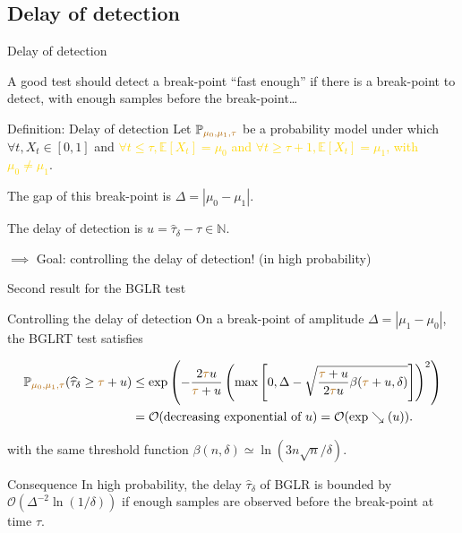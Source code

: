 \documentclass[11pt,french,ignorenonframetext,]{beamer}
\begin{document}
\subsection{\hfill{}Delay of detection\hfill{}}

\begin{frame}{Delay of detection}

  A good test should detect a break-point ``fast enough'' if there is a break-point to detect, with enough samples before the break-point\ldots

  \pause
  \begin{block}{Definition: Delay of detection}
    Let $\mathbb{P}_{\textcolor{gold}{\mu_0,\mu_1,\tau}}$ be a probability model under which $\forall t, X_t \in[0,1]$ and \textcolor{gold}{$\forall t \leq \tau, \mathbb{E}[X_t] = \mu_0$ and $\forall t \geq \tau + 1, \mathbb{E}[X_t] = \mu_1$,
    with $\mu_0 \neq \mu_1$}.

    The \alert{gap} of this break-point is $\Delta = |\mu_0 - \mu_1|$.

    The \alert{delay of detection} is $u = \widehat{\tau}_{\delta} - \tau \in\mathbb{N}$.
  \end{block}

  \alert{$\implies$ Goal: controlling the delay of detection!} (in high probability)

\end{frame}

\begin{frame}{Second result for the BGLR test \dSmiley{}}

  \begin{block}{Controlling the delay of detection}
      On a break-point of amplitude $\Delta = |\mu_1 - \mu_0|$,
      the BGLRT test satisfies
      \begin{small}
        \begin{align*}
            \mathbb{P}_{\textcolor{gold}{\mu_0,\mu_1,\tau}} (\widehat{\tau}_{\delta} \geq \textcolor{gold}{\tau} + u) &\leq \exp\left( -\frac{2\textcolor{gold}{\tau} u}{\textcolor{gold}{\tau} + u}\left(\max\left[ 0, \Delta - \sqrt{\frac{\textcolor{gold}{\tau} + u}{2\textcolor{gold}{\tau} u} \beta(\textcolor{gold}{\tau} + u,\delta)} \right]\right)^2 \right) \\
            &= \mathcal{O}(\text{decreasing exponential of~} u)
            = \mathcal{O}(\exp\searrow(u)).
        \end{align*}
      \end{small}
      with the same threshold function
      $\beta(n,\delta) \simeq \ln(3n \sqrt{n}/\delta)$.
  \end{block}

  \begin{exampleblock}{Consequence}
    In high probability, \alert{the delay $\widehat{\tau}_\delta$ of BGLR is bounded} by $\mathcal{O}(\Delta^{-2} \ln(1/\delta))$ \alert{if enough samples are observed before the break-point} at time $\tau$.
  \end{exampleblock}

\end{frame}
\end{document}
